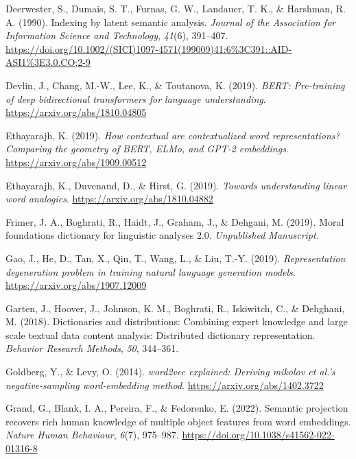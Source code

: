 \documentclass[
  man,
  floatsintext,
  longtable,
  nolmodern,
  notxfonts,
  notimes,
  colorlinks=true,linkcolor=blue,citecolor=blue,urlcolor=blue]{apa7}
\newlength{\cslhangindent}
\newenvironment{CSLReferences}[2] %
 {\begin{list}{}{%
  \setlength{\itemindent}{0pt}
  \setlength{\leftmargin}{0pt}
  \setlength{\parsep}{0pt}
  \ifodd #1
   \setlength{\leftmargin}{\cslhangindent}
   \setlength{\itemindent}{-1\cslhangindent}
  \fi
  \setlength{\itemsep}{#2\baselineskip}}}
 {\end{list}}
\begin{document}
\begin{CSLReferences}{1}{0}
Deerwester, S., Dumais, S. T., Furnas, G. W., Landauer, T. K., \&
Harshman, R. A. (1990). Indexing by latent semantic analysis.
\emph{Journal of the Association for Information Science and
Technology}, \emph{41}(6), 391--407.
\url{https://doi.org/10.1002/(SICI)1097-4571(199009)41:6\%3C391::AID-ASI1\%3E3.0.CO;2-9}

Devlin, J., Chang, M.-W., Lee, K., \& Toutanova, K. (2019). \emph{BERT:
Pre-training of deep bidirectional transformers for language
understanding}. \url{https://arxiv.org/abs/1810.04805}

Ethayarajh, K. (2019). \emph{How contextual are contextualized word
representations? Comparing the geometry of BERT, ELMo, and GPT-2
embeddings}. \url{https://arxiv.org/abs/1909.00512}

Ethayarajh, K., Duvenaud, D., \& Hirst, G. (2019). \emph{Towards
understanding linear word analogies}.
\url{https://arxiv.org/abs/1810.04882}

Frimer, J. A., Boghrati, R., Haidt, J., Graham, J., \& Dehgani, M.
(2019). Moral foundations dictionary for linguistic analyses 2.0.
\emph{Unpublished Manuscript}.

Gao, J., He, D., Tan, X., Qin, T., Wang, L., \& Liu, T.-Y. (2019).
\emph{Representation degeneration problem in training natural language
generation models}. \url{https://arxiv.org/abs/1907.12009}

Garten, J., Hoover, J., Johnson, K. M., Boghrati, R., Iskiwitch, C., \&
Dehghani, M. (2018). Dictionaries and distributions: Combining expert
knowledge and large scale textual data content analysis: Distributed
dictionary representation. \emph{Behavior Research Methods}, \emph{50},
344--361.

Goldberg, Y., \& Levy, O. (2014). \emph{word2vec explained: Deriving
mikolov et al.'s negative-sampling word-embedding method}.
\url{https://arxiv.org/abs/1402.3722}

Grand, G., Blank, I. A., Pereira, F., \& Fedorenko, E. (2022). Semantic
projection recovers rich human knowledge of multiple object features
from word embeddings. \emph{Nature Human Behaviour}, \emph{6}(7),
975--987. \url{https://doi.org/10.1038/s41562-022-01316-8}


\end{CSLReferences}
\end{document}
